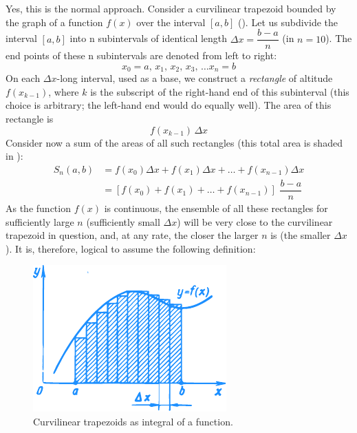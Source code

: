\athr Yes, this is the normal approach. Consider a curvilinear trapezoid bounded by the graph of a function $f (x)$ over the interval $[a, b]$ (). Let us subdivide the interval $[a, b]$ into n subintervals of identical length $\Delta x = \dfrac{b-a}{n}$ (in  $n = 10$). The end points of these n
subintervals are denoted from left to right: 
\begin{equation*}%
x_{0} = a, \, x_{1}, \, x_{2}, \,x_{3}, \, \ldots x_{n} = b
\end{equation*}
On each $\Delta x$-long interval, used as a base, we construct a \emph{rectangle} of altitude $f (x_{k-1})$, where $k$ is the subscript of the right-hand end of this subinterval (this choice is arbitrary; the left-hand end would do equally well). The area of this rectangle is
\begin{equation*}%
f (x_{k-1}) \, \Delta x
\end{equation*}
Consider now a sum of the areas of all such rectangles (this
total area is shaded in ): 
\begin{align*}%
S_{n} (a, b) & = f(x_{0}) \Delta x +  f (x_{1}) \Delta x + \ldots + f (x_{n-1}) \Delta x \\
& = [f(x_{0})  +  f (x_{1})  + \ldots + f (x_{n-1})] \,\, \dfrac{b-a}{ n}
\end{align*}
As the function $f (x)$ is continuous, the ensemble of all these rectangles for sufficiently large $n$ (sufficiently small $\Delta x$) will be very close to the curvilinear trapezoid in question, and, at any rate, the closer the larger $n$ is (the smaller $\Delta x$). It is, therefore, logical to assume the following definition:

\begin{figure}[!ht]%
\centering
\includegraphics[width=.6\textwidth]{figures/fig-52.pdf} 
\caption{Curvilinear trapezoids as integral of a function.}
\label{fig-52}
\end{figure}

